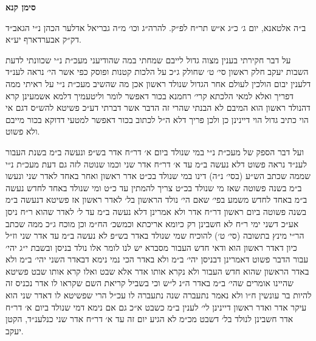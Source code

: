 \documentclass[12pt, openany]{book}
\newcommand{\chapname}{}
\newcommand{\newchap}[1]{
	\addcontentsline{toc}{chapter}{#1}
	\renewcommand{\chapname}{#1}
		\begin{center}
			\textbf{%
\fontsize{16pt}{16pt}\selectfont
				#1}
		\end{center}
}
\begin{document}
\newchap{סימן קנא}
\begin{multicols}{2}
ב״ה אלטאנא, יום ג׳ כ״ג א״ש תר״ח לפ״ק. להרה״ג וכו׳ מ״ה גבריאל אדלער הכהן נ״י הגאב״ד דק״ק אבערדארף יע״א.\\\vspace{0pt}

על דבר חקירתי בענין מצוה גדול לייבם שמחתי במה שהודיעני מעכ״ת נ״י שכוונתי לדעת השבות יעקב חלק ראשון סי׳ ט׳ שחולק ג״כ על הלכות קטנות ופוסק כפי אשר הי׳ נראה לענ״ד דלענין יבום הולכין לעולם אחר הגדול שנולד ראשון אכן מה שהשיב מעכ״ת נ״י על ראיתי ממה דפריך ואלא למאי הלכתא קרי׳ רחמנא בכור דאפשר לומר וליטעמיך דלמא אשמעינן קרא דהנולד ראשון הוא המיבם לא הבנתי שהרי זה הדבר אשר דברתי דע״כ פשיטא להש״ס דגם אי הוי כתיב גדול הוי דיינינן כן ולכן פריך דלא ה״ל לכתוב בכור דאפשר למטעי דדוקא בכור מייבם ולא פשוט.\\\vspace{0pt}

ועל דבר הספק של מעכ״ת נ״י במי שנולד ביום א׳ דר״ח אדר בש״פ ונעשה ב״מ בשנת העבור לענ״ד נראה פשוט דלא נעשה ב״מ עד א׳ דר״ח אדר שני וכמו שנוטה לזה גם דעת מעכ״ת נ״י שממה שכתב הש״ע (בסי׳ נ״ה) דינו במי שנולד בכ״ט אדר ראשון ואחר באחד לאדר שני ונעשו ב״מ בשנה פשוטה שאז מי שנולד בכ״ט צריך להמתין עד כ״ט ומי שנולד באחד לחדש נעשה ב״מ באחד לחדש משמע בפי׳ שאם הי׳ נולד הראשון בל׳ לאדר ראשון אז פשיטא דנעשה ב״מ בשנה פשוטה ביום ראשון דר״ח אדר ולא אמרינן דלא נעשה ב״מ עד ל׳ לאדר שהוא ר״ח ניסן אע״כ דשני ימי ר״ח לא חשבינן רק כיומא אריכתא וכמשכ׳ הח״מ וכן מוכח ג״כ ממה שכתב הר״י מינץ בתשובה (סי׳ ט׳) להוכיח שמי שנולד באדר בש״פ לא נעשה ב״מ עד אדר שני וז״ל כיון דאדר ראשון הוא ודאי חדש העבור מסברא יש לנו לומר אלו נולד בניסן ובשבת י״ג יהי׳ עבור הדבר פשוט דאמרינן דבניסן יהי׳ ב״מ ולא באדר הכי נמי נימא דבאדר השני יהי׳ ב״מ ולא באדר הראשון שהוא חדש העבור ולא נקרא אותו אדר אלא שבט ואלו קרא אותו שבט פשיטא שהיינו אומרים שהי׳ ב״מ באדר ה״נ ל״ש וכי בשביל קריאת השם שקראו לו אדר נכניס זה להיות בר עונשין ח״ו ולא נאמר נתעברה שנה נתעברה לו עכ״ל הרי שפשיטא לו דאדר שני הוא עיקר אדר ואדר ראשון דיינינן לי׳ לענין ב״מ כשבט א״כ גם אם נימא דמי שנולד ביום א׳ דר״ח אדר חשבינן לנולד בל׳ דשבט מכ״מ לא הגיע יום זה עד א׳ דר״ח אדר שני כנלענ״ד, הקטן יעקב.\\\vspace{0pt}

\end{multicols}\newpage
\end{document}
